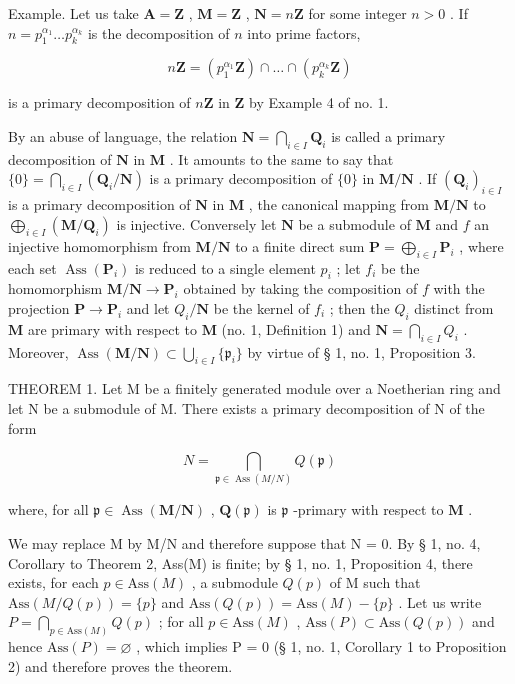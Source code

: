 Example. Let us take \(\mathbf{A} = \mathbf{Z}\) , \(\mathbf{M} = \mathbf{Z}\) , \(\mathbf{N} = n\mathbf{Z}\) for some integer \(n > 0\) . If \(n = p_{1}^{\alpha_1} \ldots p_{k}^{\alpha_k}\) is the decomposition of \(n\) into prime factors,

\[
n \mathbf {Z} = (p _ {1} ^ {\alpha_ {1}} \mathbf {Z}) \cap \dots \cap (p _ {k} ^ {\alpha_ {k}} \mathbf {Z})
\]

is a primary decomposition of \(n\mathbf{Z}\) in \(\mathbf{Z}\) by Example 4 of no. 1.

By an abuse of language, the relation \(\mathbf{N} = \bigcap_{i \in I} \mathbf{Q}_i\) is called a primary decomposition of \(\mathbf{N}\) in \(\mathbf{M}\) . It amounts to the same to say that \(\{0\} = \bigcap_{i \in I} (\mathbf{Q}_i / \mathbf{N})\) is a primary decomposition of \(\{0\}\) in \(\mathbf{M} / \mathbf{N}\) . If \((\mathbf{Q}_i)_{i \in I}\) is a primary decomposition of \(\mathbf{N}\) in \(\mathbf{M}\) , the canonical mapping from \(\mathbf{M} / \mathbf{N}\) to \(\bigoplus_{i \in I} (\mathbf{M} / \mathbf{Q}_i)\) is injective. Conversely let \(\mathbf{N}\) be a submodule of \(\mathbf{M}\) and \(f\) an injective homomorphism from \(\mathbf{M} / \mathbf{N}\) to a finite direct sum \(\mathbf{P} = \bigoplus_{i \in I} \mathbf{P}_i\) , where each set \(\operatorname{Ass}(\mathbf{P}_i)\) is reduced to a single element \(p_i\) ; let \(f_i\) be the homomorphism \(\mathbf{M} / \mathbf{N} \to \mathbf{P}_i\) obtained by taking the composition of \(f\) with the projection \(\mathbf{P} \to \mathbf{P}_i\) and let \(Q_i / \mathbf{N}\) be the kernel of \(f_i\) ; then the \(Q_i\) distinct from \(\mathbf{M}\) are primary with respect to \(\mathbf{M}\) (no. 1, Definition 1) and \(\mathbf{N} = \bigcap_{i \in I} Q_i\) . Moreover, \(\operatorname{Ass}(\mathbf{M} / \mathbf{N}) \subset \bigcup_{i \in I} \{\mathfrak{p}_i\}\) by virtue of § 1, no. 1, Proposition 3.

THEOREM 1. Let M be a finitely generated module over a Noetherian ring and let N be a submodule of M. There exists a primary decomposition of N of the form

\[
N = \bigcap_ {\mathfrak {p} \in \operatorname{Ass} (M / N)} Q (\mathfrak {p})\tag{1}
\]

where, for all \(\mathfrak{p} \in \operatorname{Ass}(\mathbf{M} / \mathbf{N})\) , \(\mathbf{Q}(\mathfrak{p})\) is \(\mathfrak{p}\) -primary with respect to \(\mathbf{M}\) .

We may replace M by M/N and therefore suppose that N = 0. By § 1, no. 4, Corollary to Theorem 2, Ass(M) is finite; by § 1, no. 1, Proposition 4, there exists, for each \(p \in \text{Ass}(M)\) , a submodule \(Q(p)\) of M such that \(\text{Ass}(M/Q(p)) = \{p\}\) and \(\text{Ass}(Q(p)) = \text{Ass}(M) - \{p\}\) . Let us write \(P = \bigcap_{p \in \text{Ass}(M)} Q(p)\) ; for all \(p \in \text{Ass}(M)\) , \(\text{Ass}(P) \subset \text{Ass}(Q(p))\) and hence \(\text{Ass}(P) = \varnothing\) , which implies P = 0 (§ 1, no. 1, Corollary 1 to Proposition 2) and therefore proves the theorem.

